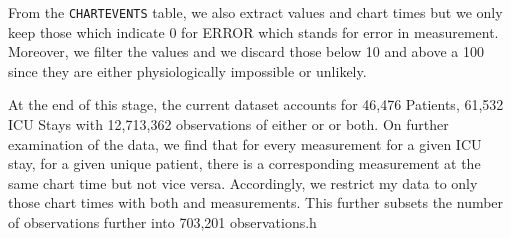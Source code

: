 From the \texttt{CHARTEVENTS} table, we also extract \Sp values and chart times but we only keep those which indicate 0 for ERROR which stands for error in measurement.  Moreover, we filter the values and we discard those below 10 and above a 100 since they are either physiologically impossible or unlikely. 

At the end of this stage, the current dataset accounts for 46,476 Patients, 61,532 ICU Stays with 12,713,362 observations of either \Sp or \Fi or both. On further examination of the data, we find that for every \Fi measurement for a given ICU stay, for a given unique patient, there is a corresponding \Sp measurement at the same chart time but not vice versa. Accordingly, we restrict my data to only those chart times with both \Sp and \Fi measurements. This further subsets the number of observations further into 703,201 observations.h


%
%
%
%
